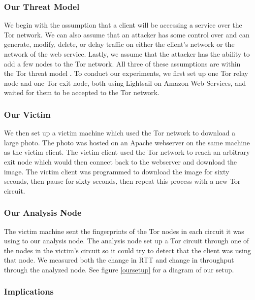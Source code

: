 \documentclass[12pt,journal]{IEEEtran}
\begin{document}
\subsubsection{Our Threat Model}
We begin with the assumption that a client will be accessing a service over the Tor network. We can also assume that an attacker has some control over and can generate, modify, delete, or delay traffic on either the client's network or the network of the web service. Lastly, we assume that the attacker has the ability to add a few nodes to the Tor network. All three of these assumptions are within the Tor threat model \cite{Dingledine:2004:TSO:1251375.1251396}.
To conduct our experiments, we first set up one Tor relay node and one Tor exit node, both using Lightsail on Amazon Web Services, and waited for them to be accepted to the Tor network.
\subsubsection{Our Victim}We then set up a victim machine which used the Tor network to download a large photo. The photo was hosted on an Apache webserver on the same machine as the victim client. The victim client used the Tor network to reach an arbitrary exit node which would then connect back to the webserver and download the image. The victim client was programmed to download the image for sixty seconds, then pause for sixty seconds, then repeat this process with a new Tor circuit.
\subsubsection{Our Analysis Node}The victim machine sent the fingerprints of the Tor nodes in each circuit it was using to our analysis node. The analysis node set up a Tor circuit through one of the nodes in the victim’s circuit so it could try to detect that the client was using that node. We measured both the change in RTT and change in throughput through the analyzed node. See figure \ref{oursetup} for a diagram of our setup.
\subsubsection{Implications}


\printbibliography
\end{document}
